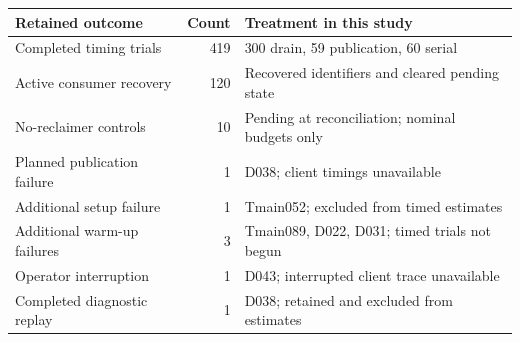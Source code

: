 \begin{tabular}{L{.40\linewidth}rL{.43\linewidth}}
\toprule
Retained outcome & Count & Treatment in this study\\
\midrule
Completed timing trials & 419 & 300 drain, 59 publication, 60 serial\\
Active consumer recovery & 120 & Recovered identifiers and cleared pending state\\
No-reclaimer controls & 10 & Pending at reconciliation; nominal budgets only\\
Planned publication failure & 1 & D038; client timings unavailable\\
\midrule
Additional setup failure & 1 & Tmain052; excluded from timed estimates\\
Additional warm-up failures & 3 & Tmain089, D022, D031; timed trials not begun\\
Operator interruption & 1 & D043; interrupted client trace unavailable\\
Completed diagnostic replay & 1 & D038; retained and excluded from estimates\\
\bottomrule
\end{tabular}
